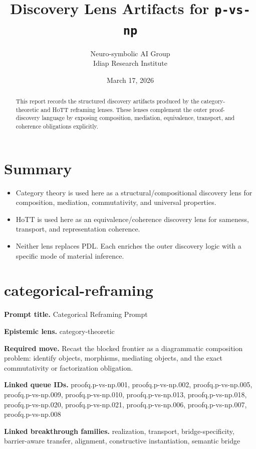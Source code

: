 \documentclass[11pt]{article}
\title{Discovery Lens Artifacts for \texttt{p-vs-np}}
\author{Neuro-symbolic AI Group\\Idiap Research Institute}
\date{March 17, 2026}
\begin{document}
\maketitle

\begin{abstract}
This report records the structured discovery artifacts produced by the category-theoretic and HoTT reframing lenses. These lenses complement the outer proof-discovery language by exposing composition, mediation, equivalence, transport, and coherence obligations explicitly.
\end{abstract}

\section{Summary}
\begin{itemize}[leftmargin=*,itemsep=0.2em]
\item Category theory is used here as a structural/compositional discovery lens for composition, mediation, commutativity, and universal properties.
\item HoTT is used here as an equivalence/coherence discovery lens for sameness, transport, and representation coherence.
\item Neither lens replaces PDL. Each enriches the outer discovery logic with a specific mode of material inference.
\end{itemize}

\section{categorical-reframing}
\textbf{Prompt title.} Categorical Reframing Prompt

\textbf{Epistemic lens.} category-theoretic

\textbf{Required move.} Recast the blocked frontier as a diagrammatic composition problem: identify objects, morphisms, mediating objects, and the exact commutativity or factorization obligation.

\textbf{Linked queue IDs.} proofq.p-vs-np.001, proofq.p-vs-np.002, proofq.p-vs-np.005, proofq.p-vs-np.009, proofq.p-vs-np.010, proofq.p-vs-np.013, proofq.p-vs-np.018, proofq.p-vs-np.020, proofq.p-vs-np.021, proofq.p-vs-np.006, proofq.p-vs-np.007, proofq.p-vs-np.008

\textbf{Linked breakthrough families.} realization, transport, bridge-specificity, barrier-aware transfer, alignment, constructive instantiation, semantic bridge
\end{document}
